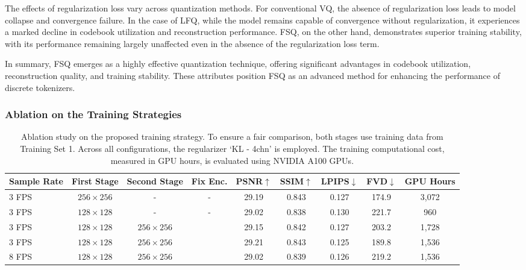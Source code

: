 \documentclass{article} %
\begin{document}
The effects of regularization loss vary across quantization methods. For conventional VQ, the absence of regularization loss leads to model collapse and convergence failure. In the case of LFQ, while the model remains capable of convergence without regularization, it experiences a marked decline in codebook utilization and reconstruction performance. FSQ, on the other hand, demonstrates superior training stability, with its performance remaining largely unaffected even in the absence of the regularization loss term.

In summary, FSQ emerges as a highly effective quantization technique, offering significant advantages in codebook utilization, reconstruction quality, and training stability. These attributes position FSQ as an advanced method for enhancing the performance of discrete tokenizers.

\subsubsection{Ablation on the Training Strategies}

\begin{table}[t]
\begin{center}
\small
\caption{Ablation study on the proposed training strategy. To ensure a fair comparison, both stages use training data from Training Set 1. Across all configurations, the regularizer `KL - 4chn' is employed. The training computational cost, measured in GPU hours, is evaluated using NVIDIA A100 GPUs.}
	\label{tab:abla_strategy}
        \setlength\tabcolsep{4pt}
        \renewcommand\arraystretch{1.1}
	\begin{tabular}{l|ccc|cccc|c}
		\toprule[1.5pt]
		Sample Rate & First Stage & Second Stage & Fix Enc. & PSNR$\uparrow$ & SSIM$\uparrow$ & LPIPS$\downarrow$ & FVD$\downarrow$ & GPU Hours\\
		\midrule
		  3 FPS& $256 \times 256$ & - & - & 29.19 & 0.843 & 0.127 & 174.9 & 3,072\\
		  3 FPS & $128 \times 128$ & - & - & 29.02  & 0.838 & 0.130 & 221.7 & 960\\
		  3 FPS & $128 \times 128$ & $256 \times 256$ & \usym{2613} & 29.15 & 0.842 & 0.127 & 203.2& 1,728\\
		3 FPS & $128 \times 128$ & $256 \times 256$ & \checkmark & 29.21& 0.843& 0.125 & 189.8 &  1,536 \\
		8 FPS & $128 \times 128$ & $256 \times 256$ & \checkmark & 29.02 & 0.839 & 0.126 & 219.2 & 1,536\\
		\bottomrule[1.5pt]
	\end{tabular}
 \vspace{-3mm}
\end{center}
\end{table}
\end{document}

